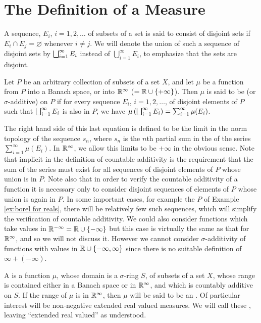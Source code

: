 \section{The Definition of a Measure}


A sequence, $E_i$, $i=1,2,\dots$ of subsets of a set is said to consist of disjoint sets if $E_i\cap E_j=\varnothing$ whenever $i\neq j$. We will denote the union of such a sequence of disjoint sets by $\bigsqcup_{i=1}^\infty E_i$ instead of $\bigcup_{i=1}^\infty E_i$, to emphasize that the sets are disjoint.

\begin{definition}
Let $P$ be an arbitrary collection of subsets of a set $X$, and let $\mu$ be a function from $P$ into a Banach space, or into $\mathbb{R}^\infty$ ($=\mathbb{R}\cup\left\{+\infty\right\}$). Then $\mu$ is said to be  (or $\sigma$-additive) on $P$ if for every sequence $E_i$, $i=1,2,\dots$, of disjoint elements of $P$ such that $\bigsqcup_{i=1}^\infty E_i$ is also in $P$, we have $\mu\left(\bigsqcup_{i=1}^\infty E_i\right)=\sum_{i=1}^\infty\mu(E_i)$. 
\end{definition}

The right hand side of this last equation is defined to be the limit in the norm topology of the sequence $s_n$, where $s_n$ is the $n$th partial sum in the of the series $\sum_{i=1}^\infty\mu(E_i)$. In $\mathbb{R}^\infty$, we allow this limits to be $+\infty$ in the obvious sense. Note that implicit in the definition of countable additivity is the requirement that the sum of the series must exist for all sequences of disjoint elements of $P$ whose union is in $P$. Note also that in order to verify the countable additivity of a function it is necessary only to consider disjoint sequences of elements of $P$ whose union is again in $P$. In some important cases, for example the $P$ of Example \ref{ex:borel for reals}, there will be relatively few such sequences, which will simplify the verification of countable additivity. We could also consider functions which take values in $\mathbb{R}^{-\infty}=\mathbb{R}\cup\left\{-\infty\right\}$ but this case is virtually the same as that for $\mathbb{R}^\infty$, and so we will not discuss it. However we cannot consider $\sigma$-additivity of functions with values in $\mathbb{R}\cup\left\{-\infty,\infty\right\}$ since there is no suitable definition of $\infty+(-\infty)$.

\begin{definition}
A  is a function $\mu$, whose domain is a $\sigma$-ring $S$, of subsets of a set $X$, whose range is contained either in a Banach space or in $\mathbb{R}^\infty$, and which is countably additive on $S$. If the range of $\mu$ is in $\mathbb{R}^\infty$, then $\mu$ will be said to be an . Of particular interest will be non-negative extended real valued measures. We will call these , leaving ``extended real valued'' as understood.
\end{definition}

